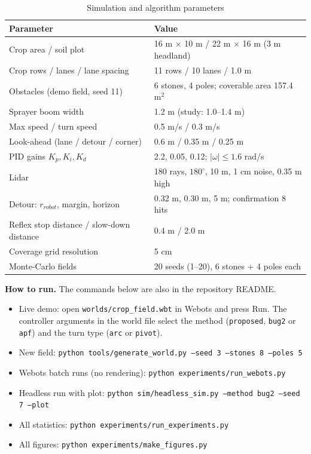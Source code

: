 \documentclass[12pt,a4paper]{article}
\begin{document}
\begin{table}[H]
\centering
\caption{Simulation and algorithm parameters}
\label{tab:params}
\renewcommand{\arraystretch}{1.15}
\begin{tabular}{|P{6.3cm}|P{6.9cm}|}
\hline
\textbf{Parameter} & \textbf{Value} \\ \hline
Crop area / soil plot & 16 m $\times$ 10 m / 22 m $\times$ 16 m (3 m headland) \\ \hline
Crop rows / lanes / lane spacing & 11 rows / 10 lanes / 1.0 m \\ \hline
Obstacles (demo field, seed 11) & 6 stones, 4 poles; coverable area 157.4 m$^2$ \\ \hline
Sprayer boom width & 1.2 m (study: 1.0--1.4 m) \\ \hline
Max speed / turn speed & 0.5 m/s / 0.3 m/s \\ \hline
Look-ahead (lane / detour / corner) & 0.6 m / 0.35 m / 0.25 m \\ \hline
PID gains $K_p, K_i, K_d$ & 2.2, 0.05, 0.12; $|\omega|\le1.6$ rad/s \\ \hline
Lidar & 180 rays, $180^\circ$, 10 m, 1 cm noise, 0.35 m high \\ \hline
Detour: $r_{robot}$, margin, horizon & 0.32 m, 0.30 m, 5 m; confirmation 8 hits \\ \hline
Reflex stop distance / slow-down distance & 0.4 m / 2.0 m \\ \hline
Coverage grid resolution & 5 cm \\ \hline
Monte-Carlo fields & 20 seeds (1--20), 6 stones + 4 poles each \\ \hline
\end{tabular}
\end{table}

\textbf{How to run.} The commands below are also in the repository README.
\begin{itemize}[itemsep=0pt,topsep=2pt]
\item Live demo: open \texttt{worlds/crop\_field.wbt} in Webots and press Run. The controller arguments in the world file select the method (\texttt{proposed}, \texttt{bug2} or \texttt{apf}) and the turn type (\texttt{arc} or \texttt{pivot}).
\item New field: \texttt{python tools/generate\_world.py --seed 3 --stones 8 --poles 5}
\item Webots batch runs (no rendering): \texttt{python experiments/run\_webots.py}
\item Headless run with plot: \texttt{python sim/headless\_sim.py --method bug2 --seed 7 --plot}
\item All statistics: \texttt{python experiments/run\_experiments.py}
\item All figures: \texttt{python experiments/make\_figures.py}
\end{itemize}
\end{document}
